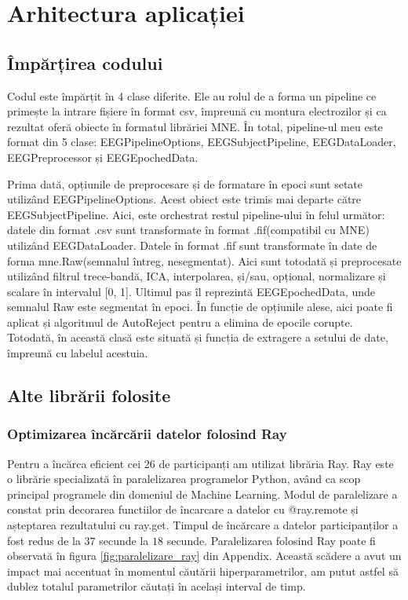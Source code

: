 \def\timpInainteDeRay{37}
\def\timpDupaRay{18}

\chapter{Arhitectura aplicației}
\section{Împărțirea codului}
Codul este împărțit în 4 clase diferite. Ele au rolul de a forma un pipeline ce primește la intrare fișiere în format csv, împreună cu montura electrozilor și ca rezultat oferă obiecte în formatul librăriei MNE\cite{MNE}.
În total, pipeline-ul meu este format din 5 clase: EEGPipelineOptions, EEGSubjectPipeline, EEGDataLoader, EEGPreprocessor și EEGEpochedData. 

Prima dată, opțiunile de preprocesare și de formatare în epoci sunt setate utilizând EEGPipelineOptions. Acest obiect este trimis mai departe către EEGSubjectPipeline. Aici, este orchestrat restul pipeline-ului în felul următor: datele din format .csv sunt transformate în format .fif(compatibil cu MNE\cite{MNE}) utilizând EEGDataLoader. Datele în format .fif sunt transformate în date de forma mne.Raw(semnalul întreg, nesegmentat). Aici sunt totodată și preprocesate utilizând filtrul trece-bandă, ICA, interpolarea, și/sau, opțional, normalizare și scalare în intervalul [0, 1].  Ultimul pas îl reprezintă EEGEpochedData, unde semnalul Raw este segmentat în epoci. În funcție de opțiunile alese, aici poate fi aplicat și algoritmul de AutoReject\cite{AutoReject} pentru a elimina de epocile corupte. Totodată, în această clasă este situată și funcția de extragere a setului de date, împreună cu labelul acestuia.


\section{Alte librării folosite}
\subsection{Optimizarea încărcării datelor folosind Ray}
Pentru a încărca eficient cei 26 de participanți am utilizat librăria Ray\cite{Ray}. Ray este o librărie specializată în paralelizarea programelor Python, având ca scop principal programele din domeniul de Machine Learning. Modul de paralelizare a constat prin decorarea functiilor de încarcare a datelor cu @ray.remote și așteptarea rezultatului cu ray.get. Timpul de încărcare a datelor participanților a fost redus de la $\timpInainteDeRay$ secunde la $\timpDupaRay$ secunde. Paralelizarea folosind Ray poate fi observată în figura \ref{fig:paralelizare_ray} din Appendix. Această scădere a avut un impact mai accentuat în momentul căutării hiperparametrilor, am putut astfel să dublez totalul parametrilor căutați în același interval de timp.

